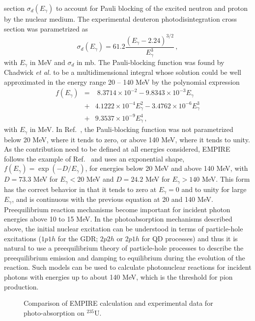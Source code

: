 \documentclass[twocolumn,amsmath,amssymb,10pt,groupedaddress,a4paper]{revtex4}
\begin{document}
section $\sigma_{d}(E_{\gamma})$ to account for Pauli blocking of
the excited neutron and proton by the nuclear medium. The experimental
deuteron photodisintegration cross section was parametrized as
\begin{equation}
\sigma_{d}(E_{\gamma})=61.2\frac{(E_{\gamma}-2.24)^{3/2}}{E_{\gamma}^{3}}\,,
\end{equation}
with $E_{\gamma}$ in MeV and $\sigma_{d}$ in mb. The Pauli-blocking
function was found by Chadwick \emph{et al.} to be a multidimensional
integral whose solution could be well approximated in the energy range
20 -- 140 MeV by the polynomial expression
\begin{eqnarray}
f(E_{\gamma}) & = & \;8.3714\times10^{-2}-9.8343\times10^{-3}E_{\gamma}\nonumber\\
&+&4.1222\times10^{-4}E_{\gamma}^{2} -3.4762\times10^{-6}E_{\gamma}^{3}\nonumber\\
&+&9.3537\times10^{-9}E_{\gamma}^{4}\,,
\end{eqnarray}
with $E_{\gamma}$ in MeV. In Ref.~\cite{chadQD}, the Pauli-blocking
function was not parametrized below 20 MeV, where it tends to zero,
or above 140 MeV, where it tends to unity. As the contribution need
to be defined at all energies considered, EMPIRE follows the example
of Ref.~\cite{PHNuc} and uses an exponential shape, $f(E_{\gamma})=\exp(-D/E_{\gamma})$,
for energies below 20 MeV and above 140 MeV, with $D=73.3$ MeV for
$E_{\gamma}<20$ MeV and $D=24.2$ MeV for $E_{\gamma}>140$ MeV.
This form has the correct behavior in that it tends to zero at $E_{\gamma}=0$
and to unity for large $E_{\gamma}$, and is continuous with the previous
equation at 20 and 140 MeV.
Preequilibrium reaction mechanisms become important for incident photon
energies above 10 to 15 MeV. In the photoabsorption mechanisms described
above, the initial nuclear excitation can be understood in terms of
particle-hole excitations ($1p1h$ for the GDR; $2p2h$ or $2p1h$
for QD processes) and thus it is natural to use a preequilibrium theory
of particle-hole processes to describe the preequilibrium emission
and damping to equilibrium during the evolution of the reaction. Such
models can be used to calculate photonuclear reactions for incident
photons with energies up to about 140 MeV, which is the threshold
for pion production.
\begin{figure}[htbp]
\caption{Comparison of EMPIRE calculation and experimental data for
photo-absorption on $^{235}$U.}
\label{u235abs}
\end{figure}
\end{document}
